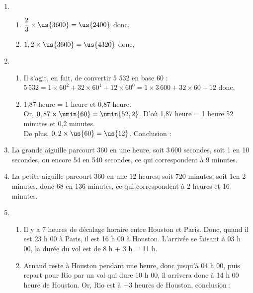 \ \\ [-5mm]
   \begin{enumerate}
      \item
      \begin{enumerate}
         \item $\dfrac23\times\us{3600} =\us{2400}$ donc, 
         \smallskip
         \item $1,2\times\us{3600} =\us{4320}$ donc, 
      \end{enumerate}
      \item
      \begin{enumerate}
         \item Il s'agit, en fait, de convertir 5 532 en base 60 : \\
         $5\,532 =1\times60^2+32\times60^1+12\times60^0 =1\times3\,600+32\times60+12$
         donc, 
         \item 1,87 heure = 1 heure et 0,87 heure. \\
         Or, $0,87\times\umin{60} =\umin{52,2}$. D'où 1,87 heure = 1 heure 52 minutes et 0,2 minutes. \\
         De plus, $0,2\times\us{60} =\us{12}$. Conclusion : 
      \end{enumerate}
      \item La grande aiguille parcourt 360\degre{} en une heure, soit 3\,600 secondes, soit 1\degre{} en 10 secondes, ou encore 54\degre{} en 540 secondes, ce qui correspondent à 9 minutes. \\
      \item La petite aiguille parcourt 360\degre{} en une 12 heures, soit 720 minutes, soit 1\degre en 2 minutes, donc 68\degre{} en 136 minutes, ce qui correspondent à 2 heures et 16 minutes. \\
      \item
      \begin{enumerate}
         \item Il y a 7 heures de décalage horaire entre Houston et Paris. Donc, quand il est 23 h 00 à Paris, il est 16 h 00 à Houston. L'arrivée se faisant à 03 h 00, la durée du vol est de 8 h + 3 h = 11 h. \\
         \item Arnaud reste à Houston pendant une heure, donc jusqu'à 04 h 00, puis repart pour Rio par un vol qui dure 10 h 00, il arrivera donc à 14 h 00 heure de Houston. Or, Rio est à $+3$ heures de Houston, conclusion : \\
      \end{enumerate}
   \end{enumerate}
